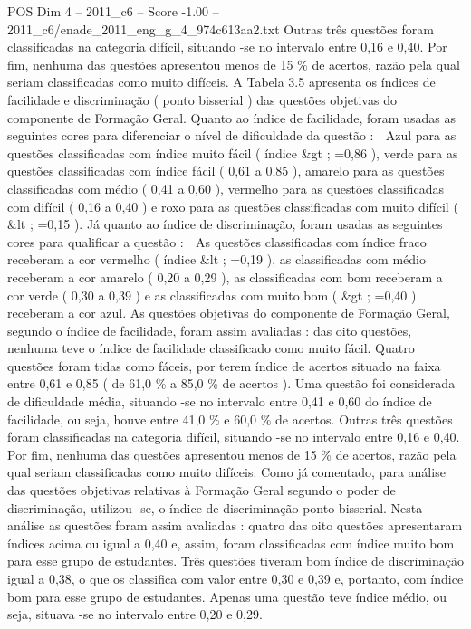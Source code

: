 \begin{textsample}{POS Dim 4 – 2011\_c6 – Score -1.00 – 2011\_c6/enade\_2011\_eng\_g\_4\_974c613aa2.txt}
Outras três questões foram classificadas na categoria difícil, situando -se no intervalo entre 0,16 e 0,40.
Por fim, nenhuma das questões apresentou menos de 15 \% de acertos, razão pela qual seriam classificadas como muito difíceis.
A Tabela 3.5 apresenta os índices de facilidade e discriminação ( ponto bisserial ) das questões objetivas do componente de Formação Geral.
Quanto ao índice de facilidade, foram usadas as seguintes cores para diferenciar o nível de dificuldade da questão :  Azul para as questões classificadas com índice muito fácil ( índice \&gt ; =0,86 ), verde para as questões classificadas com índice fácil ( 0,61 a 0,85 ), amarelo para as questões classificadas com médio ( 0,41 a 0,60 ), vermelho para as questões classificadas com difícil ( 0,16 a 0,40 ) e roxo para as questões classificadas com muito difícil ( \&lt ; =0,15 ).
Já quanto ao índice de discriminação, foram usadas as seguintes cores para qualificar a questão :  As questões classificadas com índice fraco receberam a cor vermelho ( índice \&lt ; =0,19 ), as classificadas com médio receberam a cor amarelo ( 0,20 a 0,29 ), as classificadas com bom receberam a cor verde ( 0,30 a 0,39 ) e as classificadas com muito bom ( \&gt ; =0,40 ) receberam a cor azul.
As questões objetivas do componente de Formação Geral, segundo o índice de facilidade, foram assim avaliadas : das oito questões, nenhuma teve o índice de facilidade classificado como muito fácil.
Quatro questões foram tidas como fáceis, por terem índice de acertos situado na faixa entre 0,61 e 0,85 ( de 61,0 \% a 85,0 \% de acertos ).
Uma questão foi considerada de dificuldade média, situando -se no intervalo entre 0,41 e 0,60 do índice de facilidade, ou seja, houve entre 41,0 \% e 60,0 \% de acertos.
Outras três questões foram classificadas na categoria difícil, situando -se no intervalo entre 0,16 e 0,40.
Por fim, nenhuma das questões apresentou menos de 15 \% de acertos, razão pela qual seriam classificadas como muito difíceis.
Como já comentado, para análise das questões objetivas relativas à Formação Geral segundo o poder de discriminação, utilizou -se, o índice de discriminação ponto bisserial.
Nesta análise as questões foram assim avaliadas : quatro das oito questões apresentaram índices acima ou igual a 0,40 e, assim, foram classificadas com índice muito bom para esse grupo de estudantes.
Três questões tiveram bom índice de discriminação igual a 0,38, o que os classifica com valor entre 0,30 e 0,39 e, portanto, com índice bom para esse grupo de estudantes.
Apenas uma questão teve índice médio, ou seja, situava -se no intervalo entre 0,20 e 0,29.

\end{textsample}
